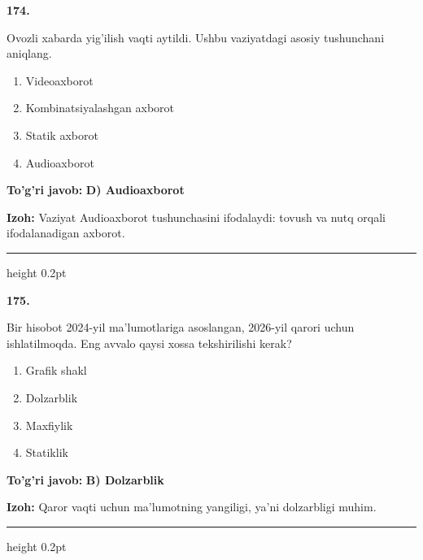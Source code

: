 \documentclass[10pt,a4paper,oneside]{article}
\begin{document}
\noindent\textbf{\color{ink}174.}
\par
Ovozli xabarda yig'ilish vaqti aytildi. Ushbu vaziyatdagi asosiy tushunchani aniqlang.
\begin{enumerate}[label=\Alph*),leftmargin=9mm]
\item Videoaxborot
\item Kombinatsiyalashgan axborot
\item Statik axborot
\item Audioaxborot
\end{enumerate}
\begin{tcolorbox}[enhanced,breakable,colback=teal!4,colframe=teal!50!black,boxrule=0.5pt,arc=1.1mm,left=3mm,right=3mm,top=1.7mm,bottom=1.7mm,before skip=2mm,after skip=2mm]
\textbf{\color{teal}To'g'ri javob:} \textbf{D) Audioaxborot}
\par\smallskip
\textbf{Izoh:} Vaziyat Audioaxborot tushunchasini ifodalaydi: tovush va nutq orqali ifodalanadigan axborot.
\end{tcolorbox}
\vspace{2mm}\hrule height 0.2pt \vspace{3mm}

\noindent\textbf{\color{ink}175.}
\par
Bir hisobot 2024-yil ma'lumotlariga asoslangan, 2026-yil qarori uchun ishlatilmoqda. Eng avvalo qaysi xossa tekshirilishi kerak?
\begin{enumerate}[label=\Alph*),leftmargin=9mm]
\item Grafik shakl
\item Dolzarblik
\item Maxfiylik
\item Statiklik
\end{enumerate}
\begin{tcolorbox}[enhanced,breakable,colback=teal!4,colframe=teal!50!black,boxrule=0.5pt,arc=1.1mm,left=3mm,right=3mm,top=1.7mm,bottom=1.7mm,before skip=2mm,after skip=2mm]
\textbf{\color{teal}To'g'ri javob:} \textbf{B) Dolzarblik}
\par\smallskip
\textbf{Izoh:} Qaror vaqti uchun ma'lumotning yangiligi, ya'ni dolzarbligi muhim.
\end{tcolorbox}
\vspace{2mm}\hrule height 0.2pt \vspace{3mm}
\end{document}
